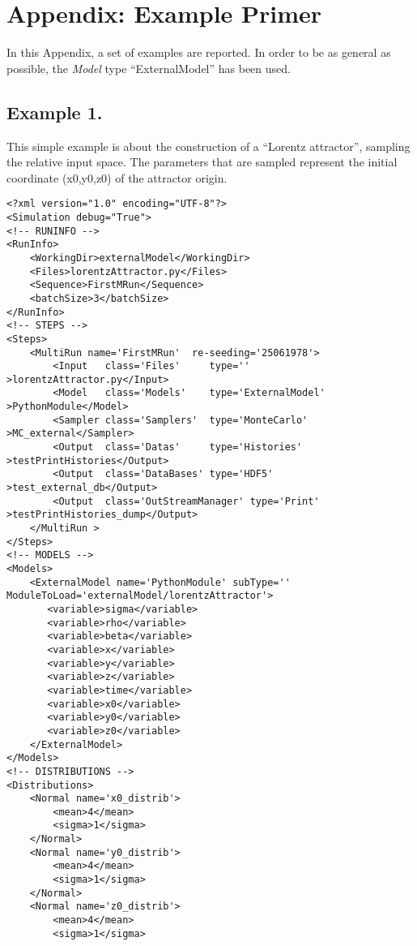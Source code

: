 \appendix
\section{Appendix: Example Primer}
\label{sec:examplePrimer}
In this Appendix, a set of examples are reported. In order to be as general as possible, the \textit{Model} type ``ExternalModel'' has been used.
\subsection{Example 1.}
\label{subsec:ex1}
This simple example is about the construction of a ``Lorentz attractor'', sampling the relative input space. The parameters that are sampled represent the initial coordinate (x0,y0,z0) of the attractor origin. 

\begin{lstlisting}[style=XML,morekeywords={debug,re,seeding,class,subType,limit}]
<?xml version="1.0" encoding="UTF-8"?>
<Simulation debug="True">
<!-- RUNINFO -->
<RunInfo>
    <WorkingDir>externalModel</WorkingDir>
    <Files>lorentzAttractor.py</Files>
    <Sequence>FirstMRun</Sequence>
    <batchSize>3</batchSize>
</RunInfo>
<!-- STEPS -->
<Steps>
    <MultiRun name='FirstMRun'  re-seeding='25061978'>
        <Input   class='Files'     type=''               >lorentzAttractor.py</Input>
        <Model   class='Models'    type='ExternalModel'  >PythonModule</Model>
        <Sampler class='Samplers'  type='MonteCarlo'     >MC_external</Sampler>
        <Output  class='Datas'     type='Histories'      >testPrintHistories</Output>
        <Output  class='DataBases' type='HDF5'           >test_external_db</Output>
        <Output  class='OutStreamManager' type='Print'   >testPrintHistories_dump</Output>
    </MultiRun >
</Steps>
<!-- MODELS -->
<Models>
    <ExternalModel name='PythonModule' subType='' ModuleToLoad='externalModel/lorentzAttractor'>  
       <variable>sigma</variable>
       <variable>rho</variable>
       <variable>beta</variable>
       <variable>x</variable>
       <variable>y</variable>
       <variable>z</variable>
       <variable>time</variable>
       <variable>x0</variable>
       <variable>y0</variable>
       <variable>z0</variable>
    </ExternalModel>
</Models>
<!-- DISTRIBUTIONS -->
<Distributions>
    <Normal name='x0_distrib'>
        <mean>4</mean>
        <sigma>1</sigma>
    </Normal>
    <Normal name='y0_distrib'>
        <mean>4</mean>
        <sigma>1</sigma>
    </Normal>
    <Normal name='z0_distrib'>
        <mean>4</mean>
        <sigma>1</sigma>

\end{lstlisting}
